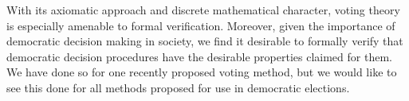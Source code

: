 \documentclass[runningheads]{llncs}
\begin{document}
With its axiomatic approach and discrete mathematical character, voting theory is especially amenable to formal verification. Moreover, given the importance of democratic decision making in society, we find it desirable to formally verify that democratic decision procedures have the desirable properties claimed for them. We have done so for one recently proposed voting method, but we would like to see this done for all methods proposed for use in democratic elections.






%
%
%
 
 
%
\end{document}
